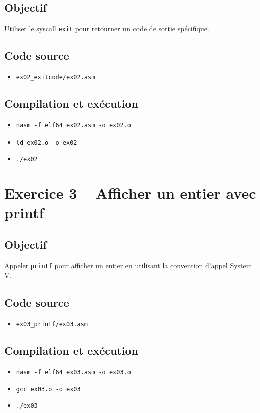 \documentclass[11pt]{article}
\begin{document}
\subsection*{Objectif}
Utiliser le syscall \texttt{exit} pour retourner un code de sortie spécifique.

\subsection*{Code source}
\begin{itemize}[noitemsep]
    \item \texttt{ex02\_exitcode/ex02.asm}
\end{itemize}

\subsection*{Compilation et exécution}
\begin{itemize}[noitemsep]
    \item \texttt{nasm -f elf64 ex02.asm -o ex02.o}
    \item \texttt{ld ex02.o -o ex02}
    \item \texttt{./ex02}
\end{itemize}

\section{Exercice 3 -- Afficher un entier avec printf}
\subsection*{Objectif}
Appeler \texttt{printf} pour afficher un entier en utilisant la convention d'appel System V.

\subsection*{Code source}
\begin{itemize}[noitemsep]
    \item \texttt{ex03\_printf/ex03.asm}
\end{itemize}

\subsection*{Compilation et exécution}
\begin{itemize}[noitemsep]
    \item \texttt{nasm -f elf64 ex03.asm -o ex03.o}
    \item \texttt{gcc ex03.o -o ex03}
    \item \texttt{./ex03}
\end{itemize}
\end{document}
